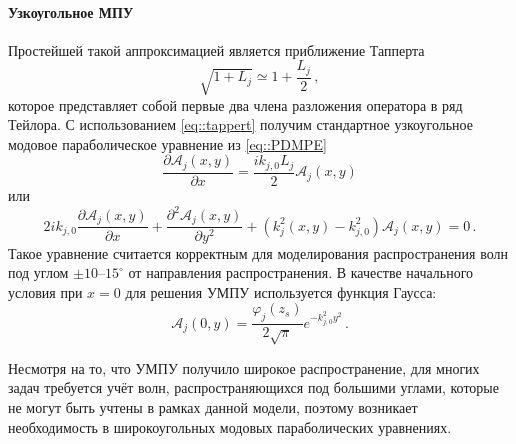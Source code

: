 \documentclass{fefu}
\newcommand{\pa}[1]{\left(#1\right)}
\begin{document}
                \paragraph{Узкоугольное МПУ}
                    \par Простейшей такой аппроксимацией является приближение Тапперта \cite{jensen}
                    \begin{equation}\label{eq::tappert}
                        \sqrt{1+L_j}\simeq 1+\frac{L_j}{2}\,,
                    \end{equation}
                    которое представляет собой первые два члена разложения оператора в ряд Тейлора. С использованием \eqref{eq::tappert} получим стандартное узкоугольное модовое параболическое уравнение из \eqref{eq::PDMPE}
                    \begin{equation}
                        \frac{\partial\mathcal{A}_j\pa{x,y}}{\partial x}=\frac{ik_{j,0}L_j}{2}\mathcal{A}_j\pa{x,y}
                    \end{equation}
                    или
                    \begin{equation}\label{eq::NAMPE}
                        2ik_{j,0}\frac{\partial\mathcal{A}_j\pa{x,y}}{\partial x}+\frac{\partial^2\mathcal{A}_j\pa{x,y}}{\partial y^2}+\pa{k_j^2\pa{x,y}-k_{j,0}^2}\mathcal{A}_j\pa{x,y}=0\,.
                    \end{equation}
                    Такое уравнение считается корректным для моделирования распространения волн под углом $\pm 10\text{--}15^\circ$ от направления распространения. В качестве начального условия при $x=0$ для решения УМПУ используется функция Гаусса:
                    \begin{equation}\label{eq::gaussian_function}
                        \mathcal{A}_j\pa{0,y}=\frac{\varphi_j\pa{z_s}}{2\sqrt{\pi}}e^{-k_{j,0}^2y^2}\,.
                    \end{equation}
                    \par Несмотря на то, что УМПУ получило широкое распространение, для многих задач требуется учёт волн, распространяющихся под большими углами, которые не могут быть учтены в рамках данной модели, поэтому возникает необходимость в широкоугольных модовых параболических уравнениях.
\end{document}
